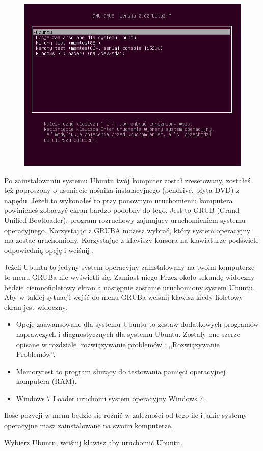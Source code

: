 \label{pierwsze_uruchomienie}
\begin{figure}
	\includegraphics[width=\linewidth]{images/pierwsze_uruchomienie_grub.png}
\end{figure}

Po zainstalowaniu systemu Ubuntu twój komputer został zresetowany, zostałeś też poproszony o usunięcie nośnika instalacyjnego (pendrive, płyta DVD) z napędu. Jeżeli to wykonałeś to przy ponownym uruchomieniu komputera powinieneś zobaczyć ekran bardzo podobny do tego. Jest to GRUB (\textcolor{ubuntu_orange}{Grand Unified Bootloader}), program rozruchowy zajmujący uruchomieniem systemu operacyjnego. Korzystając z GRUBA możesz wybrać, który system operacyjny ma zostać uruchomiony. Korzystając z klawiszy kursora na klawiaturze podświetl odpowiednią opcję i wciśnij \keys{\returnwin}.

Jeżeli Ubuntu to jedyny system operacyjny zainstalowany na twoim komputerze to menu GRUBa nie wyświetli się. Zamiast niego Przez około sekundę widoczny będzie ciemnofioletowy ekran a następnie zostanie uruchomiony system Ubuntu. Aby w takiej sytuacji wejść do menu GRUBa wciśnij klawisz  kiedy fioletowy ekran jest widoczny.

\begin{itemize}
\item \textcolor{ubuntu_orange}{Opcje zaawansowane dla systemu Ubuntu} to zestaw dodatkowych programów naprawczych i diagnostycznych dla systemu Ubuntu. Zostały one szerze opisane w rozdziale \ref{rozwiązywanie problemów}: ,,Rozwiązywanie Problemów''.
\item \textcolor{ubuntu_orange}{Memorytest} to program służący do testowania pamięci operacyjnej komputera (RAM).
\item \textcolor{ubuntu_orange}{Windows 7 Loader} uruchomi system operacyjny Windows 7.
\end{itemize}

Ilość pozycji w menu będzie się różnić w zależności od tego ile i jakie systemy operacyjne masz zainstalowane na swoim komputerze.

\begin{flushright}
Wybierz \textcolor{ubuntu_orange}{Ubuntu}, wciśnij klawisz \keys{\returnwin} aby uruchomić Ubuntu.
\end{flushright}
\clearpage
